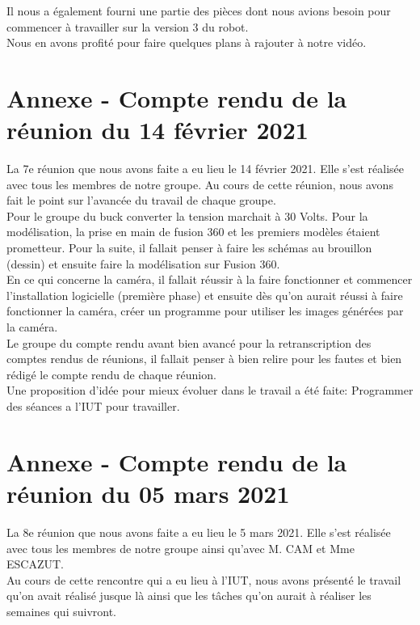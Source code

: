\documentclass{PackagerQualityN}
\begin{document}
Il nous a également fourni une partie des pièces dont nous avions besoin pour commencer à travailler sur la version 3 du robot.\\

Nous en avons profité pour faire quelques plans à rajouter à notre vidéo.

\newp
\section*{Annexe - Compte rendu de la réunion du 14 février 2021}
La 7e réunion que nous avons faite a eu lieu le 14 février 2021. Elle s'est réalisée avec tous les membres de notre groupe.
Au cours de cette réunion, nous avons fait le point sur l'avancée du travail de chaque groupe.\\

Pour le groupe du buck converter la tension marchait à 30 Volts.
Pour la modélisation, la prise en main de fusion 360 et les premiers modèles étaient prometteur. Pour la suite, il fallait  penser à faire les schémas au  brouillon (dessin) et ensuite faire la modélisation sur Fusion 360. \\

En ce qui concerne la caméra, il fallait réussir à la faire fonctionner et commencer l'installation logicielle (première phase) et ensuite dès qu'on aurait réussi à faire fonctionner la caméra, créer un programme pour utiliser les images générées par la caméra.\\

Le groupe du compte rendu avant bien avancé pour la retranscription des comptes rendus de réunions, il fallait penser à bien relire pour les fautes et bien rédigé le compte rendu de chaque réunion.\\

Une proposition d'idée pour mieux évoluer dans le travail a été faite:
Programmer des séances a l'IUT pour travailler.

\newp
\section*{Annexe - Compte rendu de la réunion du 05 mars 2021}
La 8e réunion que nous avons faite a eu lieu le 5 mars 2021. Elle s'est réalisée avec tous les membres de notre groupe ainsi qu'avec M. CAM et Mme ESCAZUT.\\

Au cours de cette rencontre qui a eu lieu à l'IUT, nous avons présenté le travail qu'on avait réalisé jusque là ainsi que les tâches qu'on aurait à réaliser les semaines qui suivront. \\
\end{document}
